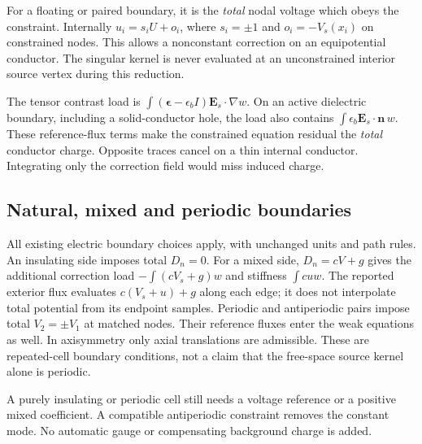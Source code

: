 \Needspace{12cm}
\begin{codeexample}[width=0pt]
\begin{tikzpicture}
  \begin{axis}[width=8cm,height=4.5cm,ybar,
      xtick={1,2},xticklabels={Left port,Right port},
      ylabel={$C_{iL}/L$ (F/m)},ymajorgrids,
      enlarge x limits=.6,bar width=16pt]
    \femmelectricmatrixplot[matrix=source capacitance,column=left,
      plot options={fill=blue!25,draw=blue!60!black}]
  \end{axis}
\end{tikzpicture}
\end{codeexample}

For a floating or paired boundary, it is the \emph{total} nodal voltage which
obeys the constraint. Internally $u_i=s_i U+o_i$, where $s_i=\pm1$ and
$o_i=-V_s(x_i)$ on constrained nodes. This allows a nonconstant correction on
an equipotential conductor. The singular kernel is never evaluated at an
unconstrained interior source vertex during this reduction.

The tensor contrast load is
$\int(\boldsymbol\epsilon-\epsilon_b I)\mathbf E_s\cdot\nabla w$.
On an active dielectric boundary, including a solid-conductor hole, the load
also contains $\int\epsilon_b\mathbf E_s\cdot\mathbf n\,w$.
These reference-flux terms make the constrained equation residual the
\emph{total} conductor charge. Opposite traces cancel on a thin internal
conductor. Integrating only the correction field would miss induced charge.

\subsection{Natural, mixed and periodic boundaries}
All existing electric boundary choices apply, with unchanged units and path
rules. An insulating side imposes total $D_n=0$. For a mixed side,
$D_n=cV+g$ gives the additional correction load $-\int(cV_s+g)w$ and stiffness
$\int cuw$. The reported exterior flux evaluates $c(V_s+u)+g$ along each edge;
it does not interpolate total potential from its endpoint samples.
Periodic and antiperiodic pairs impose total $V_2=\pm V_1$ at matched nodes.
Their reference fluxes enter the weak equations as well. In axisymmetry only
axial translations are admissible. These are repeated-cell boundary conditions,
not a claim that the free-space source kernel alone is periodic.

A purely insulating or periodic cell still needs a voltage reference or a
positive mixed coefficient. A compatible antiperiodic constraint removes the
constant mode. No automatic gauge or compensating background charge is added.


